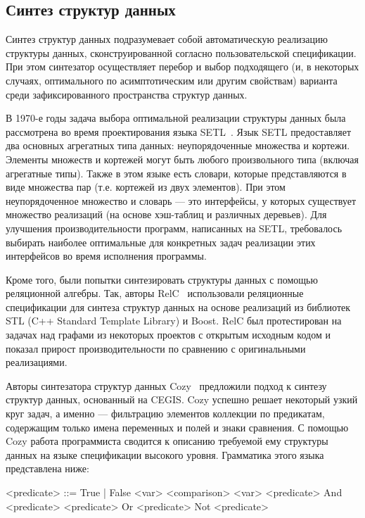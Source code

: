 \documentclass[14pt]{matmex-diploma-custom}
\begin{document}
\subsection{Синтез структур данных}
Синтез структур данных подразумевает собой автоматическую реализацию структуры данных, сконструированной согласно пользовательской спецификации. При этом синтезатор осуществляет перебор и выбор подходящего (и, в некоторых случаях, оптимального по асимптотическим или другим свойствам) варианта среди зафиксированного пространства структур данных.

В 1970-е годы задача выбора оптимальной реализации структуры данных была рассмотрена во время проектирования языка SETL~\cite{setl}. Язык SETL предоставляет два основных агрегатных типа данных: неупорядоченные множества и кортежи. Элементы множеств и кортежей могут быть любого произвольного типа (включая агрегатные типы). Также в этом языке есть словари, которые представляются в виде множества пар (т.е. кортежей из двух элементов). При этом неупорядоченное множество и словарь --- это интерфейсы, у которых существует множество реализаций (на основе хэш-таблиц и различных деревьев). Для улучшения производительности программ, написанных на SETL, требовалось выбирать наиболее оптимальные для конкретных задач реализации этих интерфейсов во время исполнения программы.

Кроме того, были попытки синтезировать структуры данных с помощью реляционной алгебры. Так, авторы RelC~\cite{RelC} использовали реляционные спецификации для синтеза структур данных на основе реализаций из библиотек STL (C++ Standard Template Library) и Boost. RelC был протестирован на задачах над графами из некоторых проектов с открытым исходным кодом и показал прирост производительности по сравнению с оригинальными реализациями.

Авторы синтезатора структур данных Cozy~\cite{Cozy} предложили подход к синтезу структур данных, основанный на CEGIS. Cozy успешно решает некоторый узкий круг задач, а именно --- фильтрацию элементов коллекции по предикатам, содержащим только имена переменных и полей и знаки сравнения.
С помощью Cozy работа программиста сводится к описанию требуемой ему структуры данных на языке спецификации высокого уровня. Грамматика этого языка представлена ниже:

\begin{grammar}
<predicate> ::= True | False 
\alt <var> <comparison> <var> 
\alt <predicate> And <predicate> \alt <predicate> Or <predicate>
\alt Not <predicate>
\end{grammar}
\end{document}
